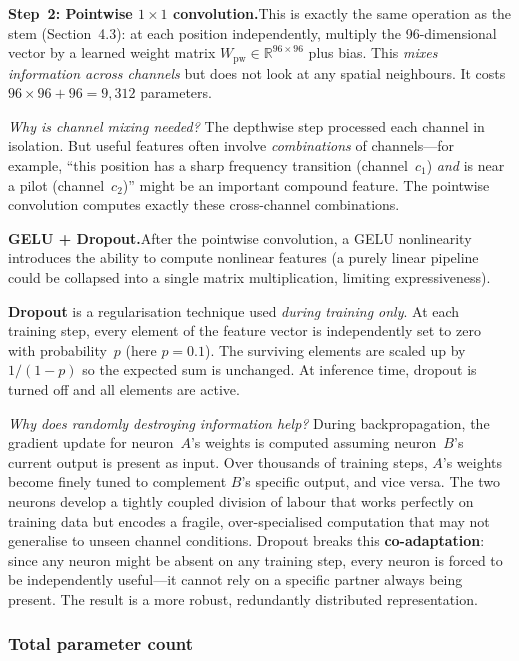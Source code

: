 \documentclass[11pt,a4paper]{article}
\begin{document}
	\medskip\noindent
	\textbf{Step~2: Pointwise $1 \times 1$ convolution.}\quad This is exactly the same operation as the stem (Section~4.3): at each position independently, multiply the 96-dimensional vector by a learned weight matrix $W_{\mathrm{pw}} \in \mathbb{R}^{96 \times 96}$ plus bias.  This \emph{mixes information across channels} but does not look at any spatial neighbours.  It costs $96 \times 96 + 96 = 9{,}312$ parameters.
	
	\emph{Why is channel mixing needed?}  The depthwise step processed each channel in isolation.  But useful features often involve \emph{combinations} of channels---for example, ``this position has a sharp frequency transition (channel~$c_1$) \emph{and} is near a pilot (channel~$c_2$)'' might be an important compound feature.  The pointwise convolution computes exactly these cross-channel combinations.
	
	\medskip\noindent
	\textbf{GELU + Dropout.}\quad After the pointwise convolution, a GELU nonlinearity introduces the ability to compute nonlinear features (a purely linear pipeline could be collapsed into a single matrix multiplication, limiting expressiveness).
	
	\textbf{Dropout} is a regularisation technique used \emph{during training only}.  At each training step, every element of the feature vector is independently set to zero with probability~$p$ (here $p\!=\!0.1$).  The surviving elements are scaled up by $1/(1-p)$ so the expected sum is unchanged.  At inference time, dropout is turned off and all elements are active.
	
	\emph{Why does randomly destroying information help?}  During backpropagation, the gradient update for neuron~$A$'s weights is computed assuming neuron~$B$'s current output is present as input.  Over thousands of training steps, $A$'s weights become finely tuned to complement $B$'s specific output, and vice versa.  The two neurons develop a tightly coupled division of labour that works perfectly on training data but encodes a fragile, over-specialised computation that may not generalise to unseen channel conditions.  Dropout breaks this \textbf{co-adaptation}: since any neuron might be absent on any training step, every neuron is forced to be independently useful---it cannot rely on a specific partner always being present.  The result is a more robust, redundantly distributed representation.
	
	\subsubsection*{Total parameter count}
	
\end{document}
